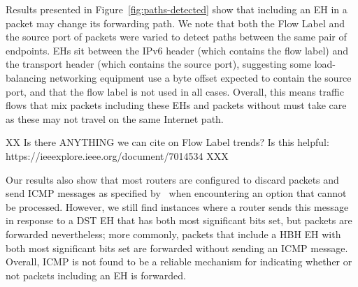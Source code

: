 \documentclass[conference]{IEEEtran}
\begin{document}



Results presented in Figure~\ref{fig:paths-detected} show that including an EH in a packet may change its forwarding path. We note that both the Flow Label and the source port of packets were varied to detect paths between the same pair of endpoints. EHs sit between the IPv6 header (which contains the flow label) and the transport header (which contains the source port), suggesting some load-balancing networking equipment use a byte offset expected to contain the source port, and that the flow label is not used in all cases. Overall, this means traffic flows that mix packets including these EHs and packets without must take care as these may not travel on the same Internet path.

XX Is there ANYTHING we can cite on Flow Label trends? Is this helpful: https://ieeexplore.ieee.org/document/7014534  XXX

Our results also show that most routers are configured to discard packets and send ICMP messages as specified by~\cite{RFC4443} when encountering an option that cannot be processed. However, we still find instances where a router sends this message in response to a DST EH that has both most significant bits set, but packets are forwarded nevertheless; more commonly, packets that include a HBH EH with both most significant bits set are forwarded without sending an ICMP message. Overall, ICMP is not found to be a reliable mechanism for indicating whether or not packets including an EH is forwarded. 
\end{document}
